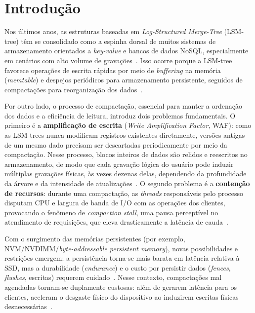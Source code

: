 \chapter{Introdução}

Nos últimos anos, as estruturas baseadas em \textit{Log-Structured Merge-Tree}
(LSM-tree) têm se consolidado como a espinha dorsal de muitos sistemas de
armazenamento orientados a \textit{key-value} e bancos de dados NoSQL, especialmente
em cenários com alto volume de gravações~\cite{leveldb,rocksdb,lsm_survey}. Isso
ocorre porque a LSM-tree favorece operações de escrita rápidas por meio de
\textit{buffering} na memória (\textit{memtable}) e despejos periódicos para
armazenamento persistente, seguidos de compactações para reorganização dos
dados~\cite{ONeil1996TheLM,Sarkar_2021}.

Por outro lado, o processo de compactação, essencial para manter a
ordenação dos dados e a eficiência de leitura, introduz dois problemas
fundamentais. O primeiro é a \textbf{amplificação de escrita} (\textit{Write
Amplification Factor}, WAF): como as LSM-trees nunca modificam registros
existentes diretamente, versões antigas de um mesmo dado precisam ser descartadas
periodicamente por meio da compactação. Nesse processo, blocos inteiros de dados
são relidos e reescritos no armazenamento, de modo que cada gravação lógica do
usuário pode induzir múltiplas gravações físicas, às vezes dezenas delas, dependendo da profundidade da árvore e da intensidade de
atualizações~\cite{Sarkar_2021,WeiBenchmarkingAA}. O segundo problema é a
\textbf{contenção de recursos}: durante uma compactação, as \textit{threads}
responsáveis pelo processo disputam CPU e largura de banda de I/O com as operações
dos clientes, provocando o fenômeno de \textit{compaction stall}, uma pausa
perceptível no atendimento de requisições, que eleva drasticamente a latência de
cauda~\cite{spooky,xanthakis2024vlsmlowtaillatency}.

Com o surgimento das memórias persistentes (por exemplo, NVM/NVDIMM/\textit{byte-addressable
persistent memory}), novas possibilidades e restrições emergem: a persistência
torna-se mais barata em latência relativa à SSD, mas a durabilidade
(\textit{endurance}) e o custo por persistir dados (\textit{fences},
\textit{flushes}, escritas) requerem cuidado~\cite{van_renen_2020}. Nesse
contexto, compactações mal agendadas tornam-se duplamente custosas: além de
gerarem latência para os clientes, aceleram o desgaste físico do dispositivo ao
induzirem escritas físicas desnecessárias~\cite{revisting_design_lsm,MatrixKV}.

